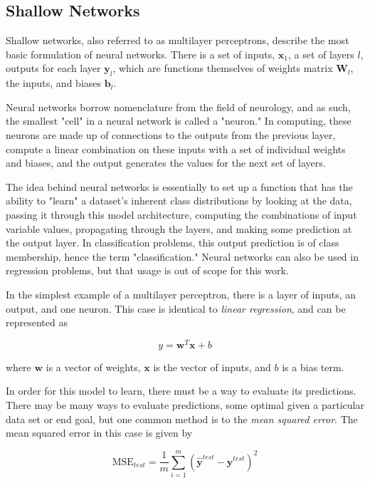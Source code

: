 \subsection{Shallow Networks}
\label{ssec:classifying_shallow}

Shallow networks, also referred to as multilayer perceptrons, describe the most basic formulation of neural networks. 
There is a set of inputs, $\mathbf{x}_1$, a set of layers $l$, outputs for each layer $\mathbf{y}_l$, which are functions themselves of weights matrix $\mathbf{W}_l$, the inputs, and biases $\mathbf{b}_l$. 

Neural networks borrow nomenclature from the field of neurology, and as such, the smallest "cell" in a neural network is called a "neuron." 
In computing, these neurons are made up of connections to the outputs from the previous layer, compute a linear combination on these inputs with a set of individual weights and biases, and the output generates the values for the next set of layers.

The idea behind neural networks is essentially to set up a function that has the ability to "learn" a dataset's inherent class distributions by looking at the data, passing it through this model architecture, computing the combinations of input variable values, propagating through the layers, and making some prediction at the output layer. 
In classification problems, this output prediction is of class membership, hence the term "classification." 
Neural networks can also be used in regression problems, but that usage is out of scope for this work.

In the simplest example of a multilayer perceptron, there is a layer of inputs, an output, and one neuron.
This case is identical to \textit{linear regression}, and can be represented as

\begin{equation}
y = \textbf{w}^T\textbf{x} + b
\end{equation}

where $\textbf{w}$ is a vector of weights, $\textbf{x}$ is the vector of inputs, and $b$ is a bias term.

In order for this model to learn, there must be a way to evaluate its predictions. 
There may be many ways to evaluate predictions, some optimal given a particular data set or end goal, but one common method is to the \textit{mean squared error}. 
The mean squared error in this case is given by

\begin{equation}
\textrm{MSE}_{test} = \frac{1}{m}\sum_{i=1}^{m}\left(\hat{\textbf{y}}^{test}-\textbf{y}^{test}\right)^2
\end{equation}

